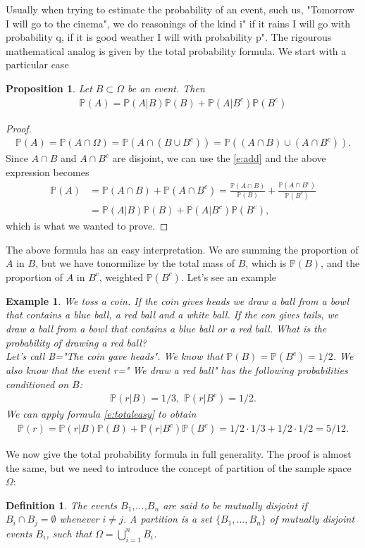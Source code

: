 \documentclass[12pt]{article}
\newtheorem{proposition}[theorem]{Proposition}
\newtheorem{definition}[theorem]{Definition}
\newtheorem{example}[theorem]{Example}
\newcommand{\<}{{\langle \!\! \langle}}
\renewcommand{\>}{{\rangle \!\! \rangle}}
\newcommand{\bel}[2]{\begin{equation} \label{#1} \begin{split} #2
 					\end{split} \end{equation}}
\begin{document}
Usually when trying to estimate the probability of an event, such us, "Tomorrow I will go to the cinema", we do reasonings of the kind i" if it rains I will go with probability q, if it  is good weather I will with probability p". The rigourous mathematical analog is given by the total probability formula. 
We start with a particular case 
\begin{proposition}
Let $B\subset \Omega$ be an event. Then 
\bel{e:totaleasy}{\mathbb{P}(A)=\mathbb{P}(A|B)\mathbb{P}(B)+\mathbb{P}(A|B^c)\mathbb{P}(B^c)}
\end{proposition}
\begin{proof}
\bel{}{\mathbb{P}(A)=\mathbb{P}(A\cap\Omega)=\mathbb{P}(A\cap(B\cup B^c))=\mathbb{P}((A\cap B)\cup (A\cap B^c)).}
Since $A\cap B$ and $A\cap B^c$ are disjoint, we can use the \eqref{e:add} and the above expression becomes
\bel{}{\mathbb{P}(A)& =\mathbb{P}(A\cap B)+\mathbb{P}(A\cap B^c)=\frac{\mathbb{P}(A\cap B)}{\mathbb{P}(B)}+\frac{\mathbb{P}(A\cap B^c)}{\mathbb{P}(B^c)}\\ &=\mathbb{P}(A|B)\mathbb{P}(B)+\mathbb{P}(A|B^c)\mathbb{P}(B^c),}
which is what we wanted to prove.
\end{proof}
The above formula has an easy interpretation. We are summing the proportion of $A$ in $B$, but we have tonormilize by the total mass of $B$, which is $\mathbb{P}(B)$, and the proportion of $A$ in $B^c$, weighted $\mathbb{P}(B^c)$. 
Let's see an example
\begin{example}
We toss a coin. If the coin gives heads we draw a ball from a bowl that contains a blue ball, a red ball and a white ball. If the con gives tails, we draw a ball from a bowl that contains a blue ball or a red ball. What is the probability of drawing a red ball?\\
Let's call B="The coin gave heads". We know that $\mathbb{P}(B)=\mathbb{P}(B^c)=1/2$. We also know that the event r=" We draw a red ball" has the following probabilities conditioned on $B$:
\bel{}{\mathbb{P}(r|B)=1/3,\,\,\mathbb{P}(r|B^c)=1/2.}
We can apply formula \eqref{e:totaleasy} to obtain 
\bel{}{\mathbb{P}(r)=\mathbb{P}(r|B)\mathbb{P}(B)+\mathbb{P}(r|B^c)\mathbb{P}(B^c)=1/2\cdot 1/3+1/2\cdot 1/2=5/12.}

\end{example} 
We now give the total probability formula in full generality. The proof is almost the same, but we need to introduce the concept of partition of the sample space $\Omega$:
\begin{definition}
The events $B_1$,...,$B_n$ are said to be mutually disjoint if $B_i\cap B_j=\emptyset$ whenever $i\neq j$.
A partition is a set $\{B_1,...,B_n\}$ of mutually disjoint events $B_i$, such that $\Omega=\bigcup_{i=1}^n B_i$.  
\end{definition}
\end{document}
